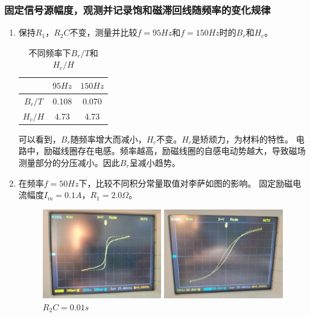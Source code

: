 \documentclass[11pt]{article}
\begin{document}
\begin{enumerate}
\begin{enumerate}
    \end{enumerate}
\end{enumerate}

\subsubsection{固定信号源幅度，观测并记录饱和磁滞回线随频率的变化规律}
\begin{enumerate}
    \item 保持$R_1$，$R_2C$不变，测量并比较$f=95Hz$和$f=150Hz$时的$B_r$和$H_c$。
    \begin{table}[H]
        \centering
        \caption{不同频率下$B_r/T$和$H_c/H$}
          \begin{tabular}{|c|c|c|}\hline
                & $95Hz$  &  $150Hz$\\\hline
            $B_r/T$ & 0.108     & 0.070 \\\hline
            $H_c/H$ & 4.73    & 4.73 \\\hline
          \end{tabular}%
        \label{tab:tab3}%
    \end{table}%
    \hspace*{2em}可以看到，$B_r$随频率增大而减小，$H_c$不变。$H_c$是矫顽力，为材料的特性。
    电路中，励磁线圈存在电感。频率越高，励磁线圈的自感电动势越大，导致磁场测量部分的分压减小。因此$B_r$呈减小趋势。
    \item 在频率$f=50Hz$下，比较不同积分常量取值对李萨如图的影响。
    \newline \hspace*{2em}固定励磁电流幅度$I_m=0.1A$，$R_1=2.0\Omega$。
    \begin{figure}[H]
        \centering
        \begin{minipage}[t]{0.33\linewidth}
            \centering
            \includegraphics[width=5.2cm]{Fig/5-0.01.jpg}
            \caption{$R_2C=0.01s$}
        \end{minipage}
        \begin{minipage}[t]{0.33\linewidth}
            \centering
            \includegraphics[width=5.2cm]{Fig/5-0.05.jpg}

\end{minipage}
\end{figure}
\end{enumerate}
\end{document}
